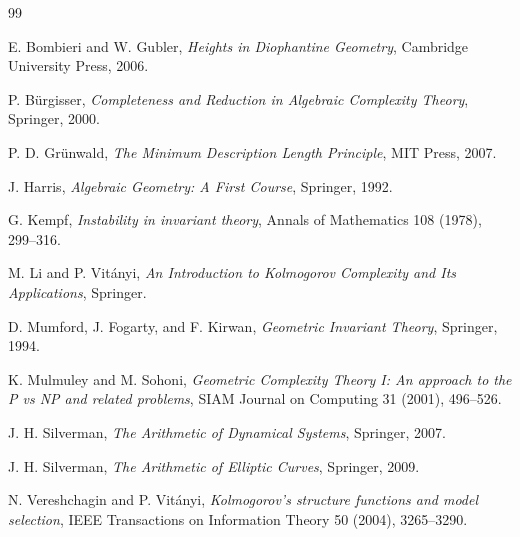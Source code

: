\documentclass[11pt]{article}
\begin{document}
\begin{thebibliography}{99}

E. Bombieri and W. Gubler,
\emph{Heights in Diophantine Geometry},
Cambridge University Press, 2006.

P. Bürgisser,
\emph{Completeness and Reduction in Algebraic Complexity Theory},
Springer, 2000.

P. D. Grünwald,
\emph{The Minimum Description Length Principle},
MIT Press, 2007.

J. Harris,
\emph{Algebraic Geometry: A First Course},
Springer, 1992.

G. Kempf,
\emph{Instability in invariant theory},
Annals of Mathematics 108 (1978), 299--316.

M. Li and P. Vitányi,
\emph{An Introduction to Kolmogorov Complexity and Its Applications},
Springer.

D. Mumford, J. Fogarty, and F. Kirwan,
\emph{Geometric Invariant Theory},
Springer, 1994.

K. Mulmuley and M. Sohoni,
\emph{Geometric Complexity Theory I: An approach to the P vs NP and related problems},
SIAM Journal on Computing 31 (2001), 496--526.

J. H. Silverman,
\emph{The Arithmetic of Dynamical Systems},
Springer, 2007.

J. H. Silverman,
\emph{The Arithmetic of Elliptic Curves},
Springer, 2009.

N. Vereshchagin and P. Vitányi,
\emph{Kolmogorov's structure functions and model selection},
IEEE Transactions on Information Theory 50 (2004), 3265--3290.

\end{thebibliography}
\end{document}
